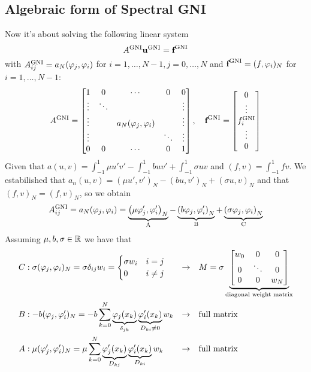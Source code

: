 \subsection*{Algebraic form of Spectral GNI}
Now it's about solving the following linear system 
\[
    A^{\text{GNI}}\textbf{u}^{\text{GNI}} = \textbf{f}^{\text{GNI}}
\]
with \(A_{ij}^{\text{GNI}} = a_N(\varphi_j, \varphi_i)\) for \(i = 1,\ldots, N-1, j = 0, \ldots, N\) and \(\textbf{f}^{\text{GNI}} = (f,\varphi_i)_N\) for \(i = 1, \ldots, N-1\):
\[
    A^{\txt{GNI}} = \left[\begin{matrix*}
        1 & 0 & \cdots & 0 & 0 \\
        \vdots & \ddots & & &\vdots\\
        \vdots & & a_N(\phi_j, \phi_i) & & \vdots \\
        \vdots & & & \ddots & \vdots \\
        0 & 0 & \cdots & 0 & 1
    \end{matrix*}\right], \quad \vect{f}^{\txt{GNI}} = \left[\begin{matrix*}
        0 \\ \vdots \\ f_i^{\txt{GNI}} \\ \vdots \\ 0
    \end{matrix*}\right]
\]
Given that \(a(u,v) = \int_{-1}^1 \mu u' v' - \int_{-1}^1 bu v' + \int_{-1}^1 \sigma u v\) and \((f,v) = \int_{-1}^1 fv\). We estabilished that \(a_n(u,v) = (\mu u', v')_N - (bu,v')_N + (\sigma u, v)_N\) and that \((f,v)_N = (f,v)_N\), so we obtain 
\[
    A_{ij}^{\text{GNI}} = a_N(\varphi_j, \varphi_i) = \underbrace{\left(\mu \varphi_j', \varphi_i'\right)_N}_{\text{A}} - \underbrace{\left(b\varphi_j, \varphi_i'\right)_N}_{\text{B}}+\underbrace{\left(\sigma \varphi_j, \varphi_i\right)_N}_{\text{C}}
\]
Assuming \(\mu, b, \sigma \in \mathbb{R}\) we have that 
\begin{align*}
    C&: \sigma(\varphi_j, \varphi_i)_N = \sigma \delta_{ij} w_i = \begin{cases}
        \sigma w_i & i = j \\
        0 & i\neq j
    \end{cases} &\rightarrow &\quad M = \sigma \underbrace{\left[\begin{matrix}
        w_0 & 0 & 0 \\ 
        0 & \ddots & 0 \\
        0 & 0 & w_N
    \end{matrix}\right]}_{\text{diagonal weight matrix}} \\
    B&: - b(\varphi_j, \varphi_i')_N = -b\sum_{k=0}^{N} \underbrace{\varphi_j(x_k)}_{\delta_{jk}}\underbrace{\varphi_i'(x_k)}_{D_{ki}\neq 0} w_k &\rightarrow& \quad \text{full matrix} \\ 
    A&: \mu(\varphi_j', \varphi_i')_N = \mu\sum_{k=0}^{N} \underbrace{\varphi_j'(x_k)}_{D_{kj}}\underbrace{\varphi_i'(x_k)}_{D_{ki}} w_k &\rightarrow& \quad \text{full matrix}
\end{align*}
